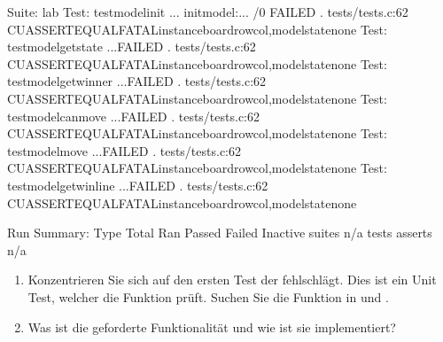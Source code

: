 \documentclass[a4paper,10pt,english]{report}
\begin{document}
\begin{sphinxVerbatim}[commandchars=\\\{\}]
Suite: lab 
  Test: test\PYGZus{}model\PYGZus{}init ...
                init\PYGZus{}model:... /0 FAILED
    . tests/tests.c:62  \PYGZhy{} CU\PYGZus{}ASSERT\PYGZus{}EQUAL\PYGZus{}FATALinstance\PYGZhy{}\PYGZgt{}board\PYG{o}{[}row\PYG{o}{]}\PYG{o}{[}col\PYG{o}{]},model\PYGZus{}state\PYGZus{}none
  Test: test\PYGZus{}model\PYGZus{}get\PYGZus{}state ...FAILED
    . tests/tests.c:62  \PYGZhy{} CU\PYGZus{}ASSERT\PYGZus{}EQUAL\PYGZus{}FATALinstance\PYGZhy{}\PYGZgt{}board\PYG{o}{[}row\PYG{o}{]}\PYG{o}{[}col\PYG{o}{]},model\PYGZus{}state\PYGZus{}none
  Test: test\PYGZus{}model\PYGZus{}get\PYGZus{}winner ...FAILED
    . tests/tests.c:62  \PYGZhy{} CU\PYGZus{}ASSERT\PYGZus{}EQUAL\PYGZus{}FATALinstance\PYGZhy{}\PYGZgt{}board\PYG{o}{[}row\PYG{o}{]}\PYG{o}{[}col\PYG{o}{]},model\PYGZus{}state\PYGZus{}none
  Test: test\PYGZus{}model\PYGZus{}can\PYGZus{}move ...FAILED
    . tests/tests.c:62  \PYGZhy{} CU\PYGZus{}ASSERT\PYGZus{}EQUAL\PYGZus{}FATALinstance\PYGZhy{}\PYGZgt{}board\PYG{o}{[}row\PYG{o}{]}\PYG{o}{[}col\PYG{o}{]},model\PYGZus{}state\PYGZus{}none
  Test: test\PYGZus{}model\PYGZus{}move ...FAILED
    . tests/tests.c:62  \PYGZhy{} CU\PYGZus{}ASSERT\PYGZus{}EQUAL\PYGZus{}FATALinstance\PYGZhy{}\PYGZgt{}board\PYG{o}{[}row\PYG{o}{]}\PYG{o}{[}col\PYG{o}{]},model\PYGZus{}state\PYGZus{}none
  Test: test\PYGZus{}model\PYGZus{}get\PYGZus{}win\PYGZus{}line ...FAILED
    . tests/tests.c:62  \PYGZhy{} CU\PYGZus{}ASSERT\PYGZus{}EQUAL\PYGZus{}FATALinstance\PYGZhy{}\PYGZgt{}board\PYG{o}{[}row\PYG{o}{]}\PYG{o}{[}col\PYG{o}{]},model\PYGZus{}state\PYGZus{}none

Run Summary:    Type  Total    Ran Passed Failed Inactive
              suites                n/a              
               tests                                
             asserts                              n/a
\end{sphinxVerbatim}
\begin{enumerate}
%
\item {} 
\sphinxAtStartPar
Konzentrieren Sie sich auf den ersten Test der fehlschlägt. Dies ist ein Unit Test, welcher die Funktion  prüft. Suchen Sie die Funktion in  und .

\item {} 
\sphinxAtStartPar
Was ist die geforderte Funktionalität und wie ist sie implementiert?

\end{enumerate}
\end{document}
